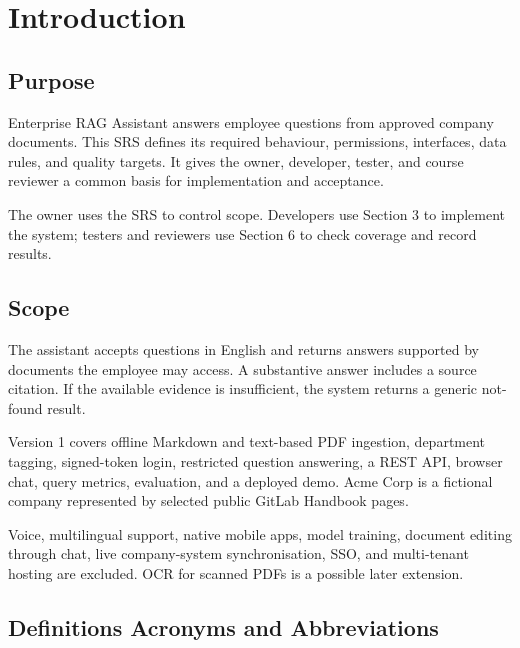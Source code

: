 \documentclass[11pt,letterpaper]{article}
\begin{document}
\clearpage

\clearpage

\section{Introduction}

\subsection{Purpose}

Enterprise RAG Assistant answers employee questions from approved company documents. This SRS defines its required behaviour, permissions, interfaces, data rules, and quality targets. It gives the owner, developer, tester, and course reviewer a common basis for implementation and acceptance.\par

The owner uses the SRS to control scope. Developers use Section 3 to implement the system; testers and reviewers use Section 6 to check coverage and record results.\par

\subsection{Scope}

The assistant accepts questions in English and returns answers supported by documents the employee may access. A substantive answer includes a source citation. If the available evidence is insufficient, the system returns a generic not-found result.\par

Version 1 covers offline Markdown and text-based PDF ingestion, department tagging, signed-token login, restricted question answering, a REST API, browser chat, query metrics, evaluation, and a deployed demo. Acme Corp is a fictional company represented by selected public GitLab Handbook pages.\par

Voice, multilingual support, native mobile apps, model training, document editing through chat, live company-system synchronisation, SSO, and multi-tenant hosting are excluded. OCR for scanned PDFs is a possible later extension.\par

\subsection{Definitions Acronyms and Abbreviations}
\end{document}
